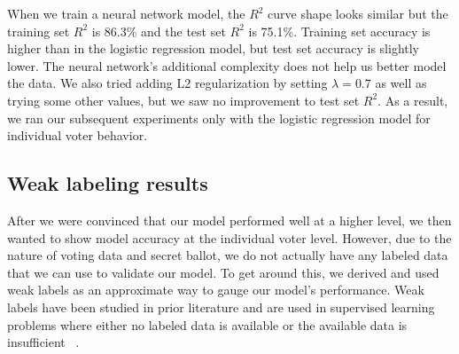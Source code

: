 \documentclass[10pt, letterpaper]{article}
\begin{document}
\begin{multicols}{2}

When we train a neural network model, the $R^2$ curve shape looks similar but the training set $R^2$ is 86.3\% and the test set $R^2$ is 75.1\%. Training set accuracy is higher than in the logistic regression model, but test set accuracy is slightly lower. The neural network's additional complexity does not help us better model the data. We also tried adding L2 regularization by setting $\lambda = 0.7$ as well as trying some other values, but we saw no improvement to test set $R^2$. As a result, we ran our subsequent experiments only with the logistic regression model for individual voter behavior.

\subsection{Weak labeling results}

After we were convinced that our model performed well at a higher level, we then wanted to show model accuracy at the individual voter level. However, due to the nature of voting data and secret ballot, we do not actually have any labeled data that we can use to validate our model. To get around this, we derived and used weak labels as an approximate way to gauge our model's performance. Weak labels have been studied in prior literature and are used in supervised learning problems where either no labeled data is available or the available data is insufficient ~\cite{rbvr2017}.


\end{multicols}
\end{document}
